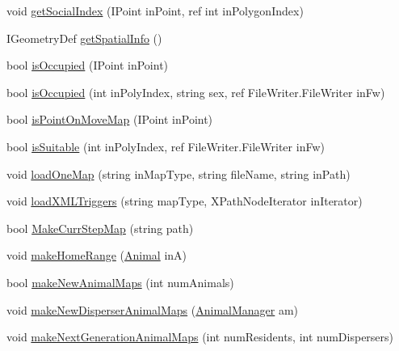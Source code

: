\begin{DoxyCompactItemize}
\item 
void \hyperlink{class_p_a_z___dispersal_1_1_map_manager_a41cf203a2f6c7a9ef11d4400411c15b3}{get\-Social\-Index} (I\-Point in\-Point, ref int in\-Polygon\-Index)
\item 
I\-Geometry\-Def \hyperlink{class_p_a_z___dispersal_1_1_map_manager_a3c236056acfd293ba8422296db91b89f}{get\-Spatial\-Info} ()
\item 
bool \hyperlink{class_p_a_z___dispersal_1_1_map_manager_a2d3fb1854e328aecd91ef5302231be3f}{is\-Occupied} (I\-Point in\-Point)
\item 
bool \hyperlink{class_p_a_z___dispersal_1_1_map_manager_a99c9fc2025e67262b36659c7273831e0}{is\-Occupied} (int in\-Poly\-Index, string sex, ref File\-Writer.\-File\-Writer in\-Fw)
\item 
bool \hyperlink{class_p_a_z___dispersal_1_1_map_manager_ab3443a8886e1e41cfe3f855997d5e9f6}{is\-Point\-On\-Move\-Map} (I\-Point in\-Point)
\item 
bool \hyperlink{class_p_a_z___dispersal_1_1_map_manager_ad1834025420d5e729fc87f60641db120}{is\-Suitable} (int in\-Poly\-Index, ref File\-Writer.\-File\-Writer in\-Fw)
\item 
void \hyperlink{class_p_a_z___dispersal_1_1_map_manager_ad7b3000224a9c084701f03d122dd03db}{load\-One\-Map} (string in\-Map\-Type, string file\-Name, string in\-Path)
\item 
void \hyperlink{class_p_a_z___dispersal_1_1_map_manager_a57f66882c07427a9ed3e36ddfe851053}{load\-X\-M\-L\-Triggers} (string map\-Type, X\-Path\-Node\-Iterator in\-Iterator)
\item 
bool \hyperlink{class_p_a_z___dispersal_1_1_map_manager_a90cb486db47510eb8488c76232c428d4}{Make\-Curr\-Step\-Map} (string path)
\item 
void \hyperlink{class_p_a_z___dispersal_1_1_map_manager_a42ee652bd2c0537d6ed82158508a5da7}{make\-Home\-Range} (\hyperlink{class_p_a_z___dispersal_1_1_animal}{Animal} in\-A)
\item 
bool \hyperlink{class_p_a_z___dispersal_1_1_map_manager_a528cc431d9c3f3c763662367983578fb}{make\-New\-Animal\-Maps} (int num\-Animals)
\item 
void \hyperlink{class_p_a_z___dispersal_1_1_map_manager_aaec73916462af9547754f729cd71de47}{make\-New\-Disperser\-Animal\-Maps} (\hyperlink{class_p_a_z___dispersal_1_1_animal_manager}{Animal\-Manager} am)
\item 
void \hyperlink{class_p_a_z___dispersal_1_1_map_manager_aa6d04e7003d94bbedc9c47ce7fb55aa9}{make\-Next\-Generation\-Animal\-Maps} (int num\-Residents, int num\-Dispersers)

\end{DoxyCompactItemize}
